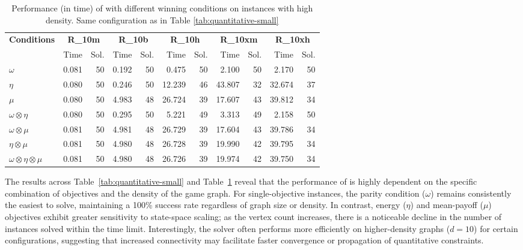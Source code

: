 \documentclass[a4paper,UKenglish,cleveref, autoref, thm-restate, anonymous]{lipics-v2021}
\begin{document}
\begin{table}[ht]
\centering
\caption{Performance (in time) of \nocq with different winning conditions on instances with high density. Same configuration as in Table \ref{tab:quantitative-small}}
\setlength{\tabcolsep}{1.2mm}
{\small 
\begin{tabular}{l|rr|rr|rr|rr|rr}
\toprule
\textbf{Conditions} & \multicolumn{2}{c|}{\textbf{R\_10m}} & \multicolumn{2}{c|}{\textbf{R\_10b}} & \multicolumn{2}{c|}{\textbf{R\_10h}} & \multicolumn{2}{c|}{\textbf{R\_10xm}} & \multicolumn{2}{c}{\textbf{R\_10xh}} \\
& Time & Sol. & Time & Sol. & Time & Sol. & Time & Sol. & Time & Sol. \\
\midrule
\textbf{$\omega$}
    & 0.081 & 50 & 0.192 & 50 & 0.475 & 50 & 2.100 & 50 & 2.170 & 50 \\
\textbf{$\eta$}
    & 0.080 & 50 & 0.246 & 50 & 12.239& 46 & 43.807& 32 & 32.674& 37 \\
\textbf{$\mu$}
    & 0.080 & 50 & 4.983 & 48 & 26.724& 39 & 17.607& 43 & 39.812& 34 \\
\textbf{$\omega \otimes \eta$}
    & 0.080 & 50 & 0.295 & 50 & 5.221 & 49 & 3.313 & 49 & 2.158 & 50 \\
\textbf{$\omega \otimes \mu$}
    & 0.081 & 50 & 4.981 & 48 & 26.729& 39 & 17.604& 43 & 39.786& 34 \\
\textbf{$\eta \otimes \mu$}
    & 0.081 & 50 & 4.980 & 48 & 26.728& 39 & 19.990& 42 & 39.795& 34 \\
\textbf{$\omega \otimes \eta \otimes \mu$}
    & 0.081 & 50 & 4.980 & 48 & 26.726& 39 & 19.974& 42 & 39.750& 34 \\
\bottomrule
\end{tabular}
}
\label{tab:quantitative-large}
\end{table}

The results across Table~\ref{tab:quantitative-small} and Table~\ref{tab:quantitative-large} reveal that the performance of \nocq is highly dependent on the specific combination of objectives and the density of the game graph. For single-objective instances, the parity condition ($\omega$) remains consistently the easiest to solve, maintaining a 100\% success rate regardless of graph size or density. In contrast, energy ($\eta$) and mean-payoff ($\mu$) objectives exhibit greater sensitivity to state-space scaling; as the vertex count increases, there is a noticeable decline in the number of instances solved within the time limit. Interestingly, the solver often performs more efficiently on higher-density graphs ($d=10$) for certain configurations, suggesting that increased connectivity may facilitate faster convergence or propagation of quantitative constraints.
\end{document}
